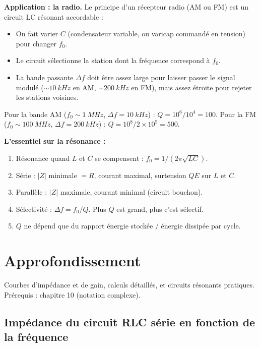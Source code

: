 \documentclass[12pt,a4paper,twoside]{book}
\begin{document}
\begin{pratique}
\textbf{Application : la radio.} Le principe d'un récepteur radio (AM ou FM) est un circuit LC résonant accordable :
\begin{itemize}[nosep]
\item On fait varier $C$ (condensateur variable, ou varicap commandé en tension) pour changer $f_0$.
\item Le circuit sélectionne la station dont la fréquence correspond à $f_0$.
\item La bande passante $\Delta f$ doit être assez large pour laisser passer le signal modulé ($\sim\SI{10}{kHz}$ en AM, $\sim\SI{200}{kHz}$ en FM), mais assez étroite pour rejeter les stations voisines.
\end{itemize}
Pour la bande AM ($f_0 \sim \SI{1}{MHz}$, $\Delta f = \SI{10}{kHz}$) : $Q = 10^6/10^4 = 100$. Pour la FM ($f_0 \sim \SI{100}{MHz}$, $\Delta f = \SI{200}{kHz}$) : $Q = 10^8/2\times10^5 = 500$.
\end{pratique}

\begin{retenir}
\textbf{L'essentiel sur la résonance :}
\begin{enumerate}[nosep]
\item Résonance quand $L$ et $C$ se compensent : $f_0 = 1/(2\pi\sqrt{LC})$.
\item Série : $|Z|$ minimale $= R$, courant maximal, surtension $QE$ sur $L$ et $C$.
\item Parallèle : $|Z|$ maximale, courant minimal (circuit bouchon).
\item Sélectivité : $\Delta f = f_0/Q$. Plus $Q$ est grand, plus c'est sélectif.
\item $Q$ ne dépend que du rapport énergie stockée / énergie dissipée par cycle.
\end{enumerate}
\end{retenir}

\section{Approfondissement}

\begin{approfondissement}
Courbes d'impédance et de gain, calculs détaillés, et circuits résonants pratiques. Prérequis : chapitre 10 (notation complexe).
\end{approfondissement}

\subsection{Impédance du circuit RLC série en fonction de la fréquence}
\end{document}
